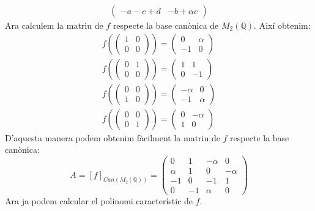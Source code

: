 \documentclass[11pt,a4paper]{article}
\begin{document}
\begin{enumerate}
\begin{multline*}
\begin{pmatrix}
    -a-c+d & -b+\alpha c
    \end{pmatrix}
    \end{multline*}
    Ara calculem la matriu de $f$ respecte la base canònica de $M_2(\mathbb{Q})$. Així obtenim:
    \begin{align*}
        f\left(\begin{pmatrix}
    1 & 0\\
    0 & 0
    \end{pmatrix}\right)=\begin{pmatrix}
    0 & \alpha\\
    -1 & 0
    \end{pmatrix}\\
    f\left(\begin{pmatrix}
    0 & 1\\
    0 & 0
    \end{pmatrix}\right)=\begin{pmatrix}
    1 & 1\\
    0 & -1
    \end{pmatrix}\\
    f\left(\begin{pmatrix}
    0 & 0\\
    1 & 0
    \end{pmatrix}\right)=\begin{pmatrix}
    -\alpha & 0\\
    -1 & \alpha
    \end{pmatrix}\\
    f\left(\begin{pmatrix}
    0 & 0\\
    0 & 1
    \end{pmatrix}\right)=\begin{pmatrix}
    0 & -\alpha\\
    1 & 0
    \end{pmatrix}
    \end{align*}
    D'aquesta manera podem obtenim fàcilment la matriu de $f$ respecte la base canònica:
    \begin{equation*}
        A=[f]_{Can(M_2(\mathbb{Q}))}=\begin{pmatrix}
    0 & 1 & -\alpha & 0\\
    \alpha & 1 & 0 & -\alpha\\
    -1 & 0 & -1 & 1\\
    0 & -1 & \alpha & 0
    \end{pmatrix}
    \end{equation*}
    Ara ja podem calcular el polinomi característic de $f$.

\end{enumerate}
\end{document}
